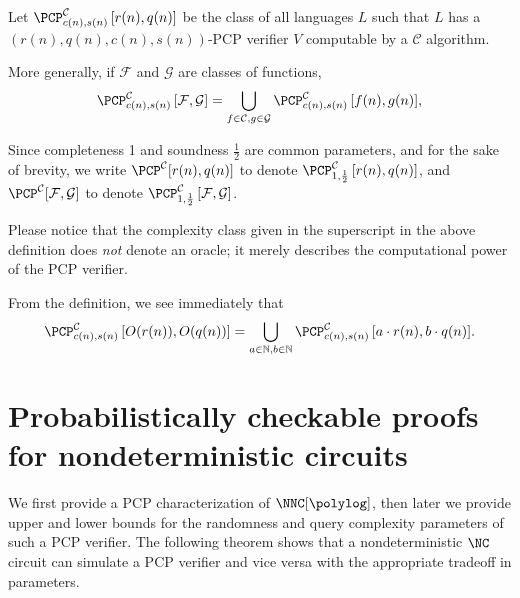 \begin{definition}
  Let $\PCPcs{\mathcal{C}}{c(n)}{s(n)}{r(n)}{q(n)}$ be the class of all languages $L$ such that $L$ has a $(r(n), q(n), c(n), s(n))$-PCP verifier $V$ computable by a $\mathcal{C}$ algorithm.

  More generally, if $\mathcal{F}$ and $\mathcal{G}$ are classes of functions,
  \begin{equation*}
    \PCPcs{\mathcal{C}}{c(n)}{s(n)}{\mathcal{F}}{\mathcal{G}} = \bigcup_{f \in \mathcal{C}, g \in \mathcal{G}}{\PCPcs{\mathcal{C}}{c(n)}{s(n)}{f(n)}{g(n)}},
    \end{equation*}

  Since completeness 1 and soundness $\frac{1}{2}$ are common parameters, and for the sake of brevity, we write $\PCP^{\mathcal{C}}[r(n), q(n)]$ to denote $\PCPcs{\mathcal{C}}{1}{\frac{1}{2}}{r(n)}{q(n)}$, and $\PCP^{\mathcal{C}}[\mathcal{F}, \mathcal{G}]$ to denote $\PCPcs{\mathcal{C}}{1}{\frac{1}{2}}{\mathcal{F}}{\mathcal{G}}$.
\end{definition}

Please notice that the complexity class given in the superscript in the above definition does \emph{not} denote an oracle; it merely describes the computational power of the PCP verifier.

From the definition, we see immediately that
\begin{equation*}
  \PCPcs{\mathcal{C}}{c(n)}{s(n)}{O(r(n))}{O(q(n))} = \bigcup_{a \in \mathbb{N}, b \in \mathbb{N}}{\PCPcs{\mathcal{C}}{c(n)}{s(n)}{a \cdot r(n)}{b \cdot q(n)}}.
\end{equation*}

\section{Probabilistically checkable proofs for nondeterministic circuits}

We first provide a PCP characterization of $\NNC[\polylog]$, then later we provide upper and lower bounds for the randomness and query complexity parameters of such a PCP verifier.
The following theorem shows that a nondeterministic $\NC$ circuit can simulate a PCP verifier and vice versa with the appropriate tradeoff in parameters.

